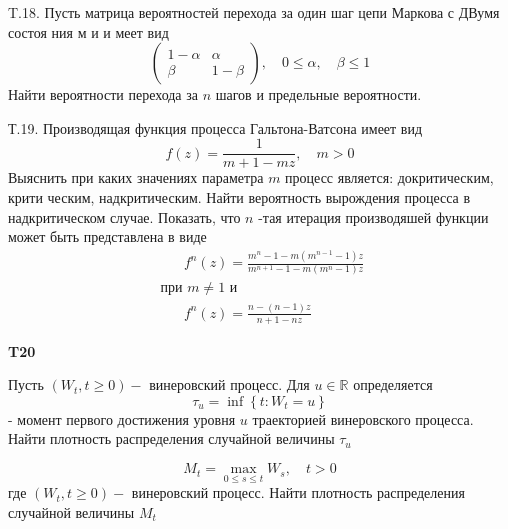 \documentclass[a4paper,12pt]{article} %
\begin{document}
\begin{example}

T.18. Пусть матрица вероятностей перехода за один шаг цепи Маркова с
ДВумя состоя ния м и и меет вид
$$
\left(\begin{array}{cc}
1-\alpha & \alpha \\
\beta & 1-\beta
\end{array}\right), \quad 0 \leqslant \alpha, \quad \beta \leqslant 1
$$
Найти вероятности перехода за $n$ шагов и предельные вероятности.




\end{example}



\begin{example}

Т.19. Производящая функция процесса Гальтона-Ватсона имеет вид
$$
f(z)=\frac{1}{m+1-m z}, \quad m>0
$$
Выяснить при каких значениях параметра $m$ процесс является: докритическим, крити ческим, надкритическим. 
Найти вероятность вырождения процесса в надкритическом случае. 
Показать, что $n$ -тая итерация производяшей функции может быть представлена в виде
\begin{equation}
\begin{array}{l}
\qquad f^{n}(z)=\frac{m^{n}-1-m\left(m^{n-1}-1\right) z}{m^{n+1}-1-m\left(m^{n}-1\right) z} \\
\text { при } m \neq 1 \text { и } \\
\qquad f^{n}(z)=\frac{n-(n-1) z}{n+1-n z}
\end{array}
\end{equation}


\end{example}





\begin{example}\textbf{T20}

Пусть $\left(W_{t}, t \geq 0\right)-$ винеровский процесс. Для $u \in \mathbb{R}$ определяется
$$
\tau_{u}=\inf \left\{t: W_{t}=u\right\}
$$
- момент первого достижения уровня $u$ траекторией винеровского процесса. 
Найти плотность распределения случайной величины $\tau_{u}$




\end{example}






\begin{example}

$$
M_{t}=\max _{0 \leq s \leq t} W_{s}, \quad t>0
$$
где $\left(W_{t}, t \geq 0\right)-$ винеровский процесс. Найти плотность распределения случайной величины $M_{t}$




\end{example}
\end{document}
